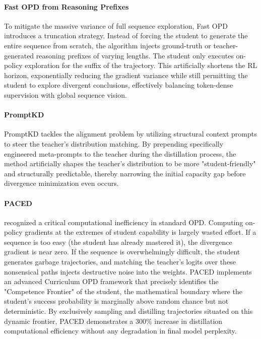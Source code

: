 \documentclass{article} %
\begin{document}
\paragraph{Fast OPD from Reasoning Prefixes}
To mitigate the massive variance of full sequence exploration, Fast OPD \citep{2602.15260} introduces a truncation strategy. Instead of forcing the student to generate the entire sequence from scratch, the algorithm injects ground-truth or teacher-generated reasoning prefixes of varying lengths. The student only executes on-policy exploration for the suffix of the trajectory. This artificially shortens the RL horizon, exponentially reducing the gradient variance while still permitting the student to explore divergent conclusions, effectively balancing token-dense supervision with global sequence vision.

\paragraph{PromptKD}
PromptKD \citep{2402.12842} tackles the alignment problem by utilizing structural context prompts to steer the teacher's distribution matching. By prepending specifically engineered meta-prompts to the teacher during the distillation process, the method artificially shapes the teacher's distribution to be more "student-friendly" and structurally predictable, thereby narrowing the initial capacity gap before divergence minimization even occurs.

\paragraph{PACED}
\citet{2603.11178} recognized a critical computational inefficiency in standard OPD. Computing on-policy gradients at the extremes of student capability is largely wasted effort. If a sequence is too easy (the student has already mastered it), the divergence gradient is near zero. If the sequence is overwhelmingly difficult, the student generates garbage trajectories, and matching the teacher's logits over these nonsensical paths injects destructive noise into the weights. PACED implements an advanced Curriculum OPD framework that precisely identifies the "Competence Frontier" of the student, the mathematical boundary where the student's success probability is marginally above random chance but not deterministic. By exclusively sampling and distilling trajectories situated on this dynamic frontier, PACED demonstrates a 300\% increase in distillation computational efficiency without any degradation in final model perplexity.
\end{document}
